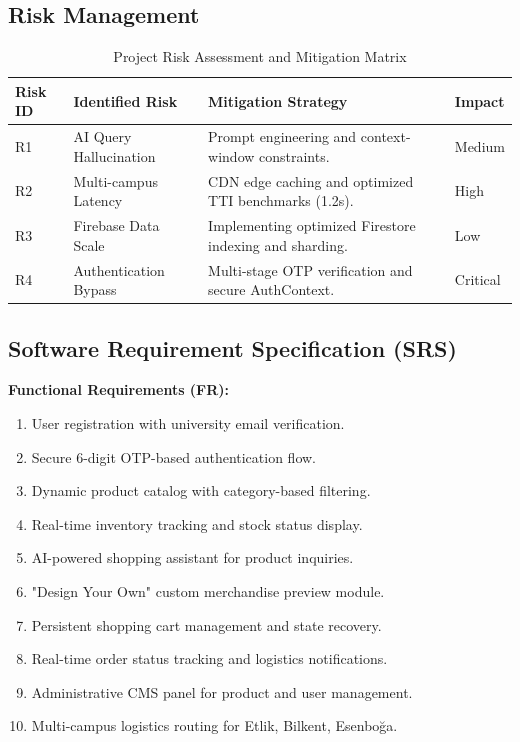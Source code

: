 \documentclass[11pt,a4paper]{article}
\begin{document}
\subsection{Risk Management}
\begin{table}[h]
\centering
\begin{tabularx}{\textwidth}{@{}lXXl@{}}
\toprule
\textbf{Risk ID} & \textbf{Identified Risk} & \textbf{Mitigation Strategy} & \textbf{Impact} \\ \midrule
R1 & AI Query Hallucination & Prompt engineering and context-window constraints. & Medium \\
R2 & Multi-campus Latency & CDN edge caching and optimized TTI benchmarks (1.2s). & High \\
R3 & Firebase Data Scale & Implementing optimized Firestore indexing and sharding. & Low \\
R4 & Authentication Bypass & Multi-stage OTP verification and secure AuthContext. & Critical \\ \bottomrule
\end{tabularx}
\caption{Project Risk Assessment and Mitigation Matrix}
\end{table}

\subsection{Software Requirement Specification (SRS)}
\textbf{Functional Requirements (FR):}
\begin{enumerate}
    \item User registration with university email verification.
    \item Secure 6-digit OTP-based authentication flow.
    \item Dynamic product catalog with category-based filtering.
    \item Real-time inventory tracking and stock status display.
    \item AI-powered shopping assistant for product inquiries.
    \item "Design Your Own" custom merchandise preview module.
    \item Persistent shopping cart management and state recovery.
    \item Real-time order status tracking and logistics notifications.
    \item Administrative CMS panel for product and user management.
    \item Multi-campus logistics routing for Etlik, Bilkent, Esenboğa.
\end{enumerate}
\end{document}
